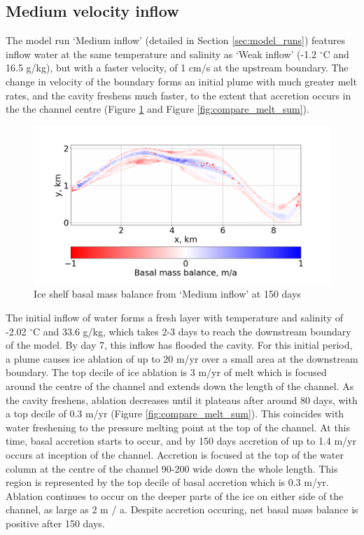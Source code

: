 

\subsection{Medium velocity inflow} \label{sec:medium_inflow}

The model run `Medium inflow' (detailed in Section \ref{sec:model_runs}) features inflow water at the same temperature and salinity as `Weak inflow' (-1.2 $^{\circ}$C and 16.5 g/kg), but with a faster velocity, of 1 cm/s at the upstream boundary. The change in velocity of the boundary forms an initial plume with much greater melt rates, and the cavity freshens much faster, to the extent that accretion occurs in the the channel centre (Figure \ref{fig:accretion} and Figure \ref{fig:compare_melt_sum}).

\begin{figure}[!ht]
\centering
\includegraphics[width=1\textwidth]{chapters/4/accretion.png}
\caption[Medium inflow (melt)]{Ice shelf basal mass balance from `Medium inflow' at 150 days}
\label{fig:accretion}
\end{figure}

The initial inflow of water forms a fresh layer with temperature and salinity of -2.02 $^{\circ}$C and 33.6  g/kg, which takes 2-3 days to reach the downstream boundary of the model. By day 7, this inflow has flooded the cavity.  
For this initial period, a plume causes ice ablation of up to 20 m/yr over a small area at the downstream boundary. The top decile of ice ablation is 3 m/yr of melt which is focused around the centre of the channel and extends down the length of the channel. As the cavity freshens, ablation decreases until it plateaus after around 80 days, with a top decile of 0.3 m/yr (Figure \ref{fig:compare_melt_sum}). This coincides with water freshening to the pressure melting point at the top of the channel. At this time, basal accretion starts to occur, and by 150 days accretion of up to 1.4 m/yr occurs at inception of the channel. Accretion is focused at the top of the water column at the centre of the channel 90-200 wide down the whole length. This region is represented by the top decile of basal accretion which is 0.3 m/yr. Ablation continues to occur on the deeper parts of the ice on either side of the channel, as large as 2 m / a. Despite accretion occuring, net basal mass balance is positive after 150 days.


